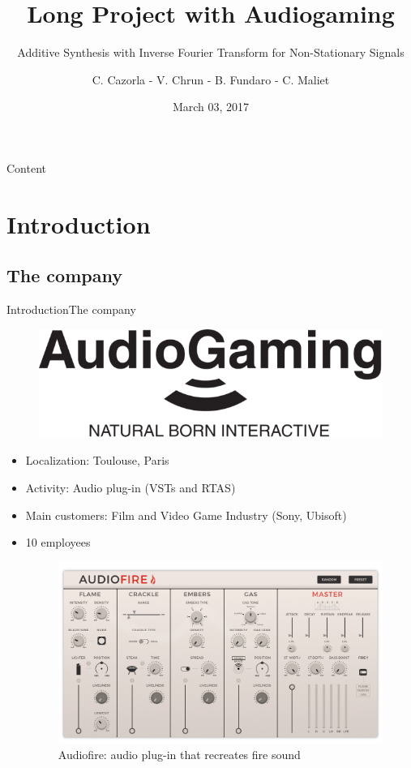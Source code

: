 \documentclass{bredelebeamer}
\title[Long Project with Audiogaming]{Long Project with Audiogaming}
\subtitle{Additive Synthesis with Inverse Fourier Transform for Non-Stationary Signals }
\author{ \hspace{0.3cm} C. Cazorla - V. Chrun - B. Fundaro - C. Maliet \hspace{0.3cm} }
\institute[Audiogaming Supervisor ]
{
  \normalsize Audiogaming Supervisor : \\
 \normalsize Chunghsin Yeh
  }
\date{March 03, 2017}
\begin{document}
\begin{frame}
  \titlepage
\end{frame}




\begin{frame}{Content}
  \tableofcontents
\end{frame}

\section{Introduction}
\subsection{The company}
\begin{frame}{Introduction}{The company}
	\begin{figure}
   	 \centering
  	 \includegraphics[scale=0.12]{ag.png}
	 \end{figure}
  \begin{itemize}
  \item<1-> Localization: Toulouse, Paris
  \item<1-> Activity: Audio plug-in (VSTs and RTAS)
  \item<1-> Main customers: Film and Video Game Industry (Sony, Ubisoft)
  \item<1-> 10 employees
	\begin{figure}
	\includegraphics[scale=0.12]{AudioFire_screen.png}
	\caption{Audiofire: audio plug-in that recreates fire sound}
	\end{figure}
  \end{itemize}
\end{frame}
\end{document}
